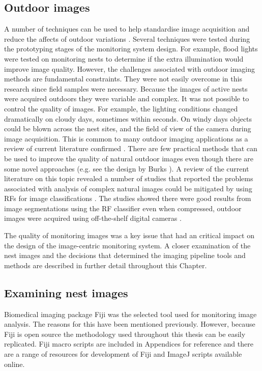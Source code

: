 \subsection{Outdoor images}
A number of techniques can be used to help standardise image acquisition and reduce the affects of outdoor variations \cite{Burks2000}. Several techniques were tested during the prototyping stages of the monitoring system design. For example, flood lights were tested on monitoring nests to determine if the extra illumination would improve image quality. However, the challenges associated with outdoor imaging methods are fundamental constraints. They were not easily overcome in this research since field samples were necessary. Because the images of active nests were acquired outdoors they were variable and complex. It was not possible to control the quality of images. For example, the lighting conditions changed dramatically on cloudy days, sometimes within seconds. On windy days objects could be blown across the nest sites, and the field of view of the camera during image acquisition. This is common to many outdoor imaging applications as a review of current literature confirmed \cite{Burks2000,Feng2015a,Feng2015b}. There are few practical methods that can be used to improve the quality of natural outdoor images even though there are some novel approaches (e.g. see the design by Burks \cite{Burks2000}). A review of the current literature on this topic revealed  a number of studies that reported the problems associated with analysis of complex natural images could be mitigated by using \acp{RF} for image classifications \cite{Feng2015a,Feng2015b}. The studies showed there were good results from image segmentations using the \ac{RF} classifier even when compressed, outdoor images were acquired using off-the-shelf digital cameras \cite{Feng2015a,Feng2015b}. 

The quality of monitoring images was a key issue that had an critical impact on the design of the image-centric monitoring system. A closer examination of the nest images and the decisions that determined the imaging pipeline tools and methods are described in further detail throughout this Chapter.

\subsection{Examining nest images}
Biomedical imaging package \ac{Fiji} was the selected tool used for monitoring image analysis. The reasons for this have been mentioned previously. However, because Fiji is open source the methodology used throughout this thesis can be easily replicated. Fiji macro scripts are included in Appendices for reference and there are a range of resources for development of Fiji and ImageJ scripts available online.

